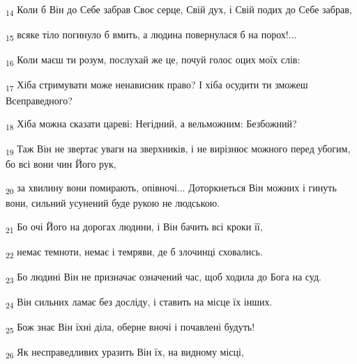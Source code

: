 \begin{tcolorbox}
\textsubscript{14} Коли б Він до Себе забрав Своє серце, Свій дух, і Свій подих до Себе забрав,
\end{tcolorbox}
\begin{tcolorbox}
\textsubscript{15} всяке тіло погинуло б вмить, а людина повернулася б на порох!...
\end{tcolorbox}
\begin{tcolorbox}
\textsubscript{16} Коли маєш ти розум, послухай же це, почуй голос оцих моїх слів:
\end{tcolorbox}
\begin{tcolorbox}
\textsubscript{17} Хіба стримувати може ненависник право? І хіба осудити ти зможеш Всеправедного?
\end{tcolorbox}
\begin{tcolorbox}
\textsubscript{18} Хіба можна сказати цареві: Негідний, а вельможним: Безбожний?
\end{tcolorbox}
\begin{tcolorbox}
\textsubscript{19} Таж Він не звертає уваги на зверхників, і не вирізнює можного перед убогим, бо всі вони чин Його рук,
\end{tcolorbox}
\begin{tcolorbox}
\textsubscript{20} за хвилину вони помирають, опівночі... Доторкнеться Він можних і гинуть вони, сильний усунений буде рукою не людською.
\end{tcolorbox}
\begin{tcolorbox}
\textsubscript{21} Бо очі Його на дорогах людини, і Він бачить всі кроки її,
\end{tcolorbox}
\begin{tcolorbox}
\textsubscript{22} немає темноти, немає і темряви, де б злочинці сховались.
\end{tcolorbox}
\begin{tcolorbox}
\textsubscript{23} Бо людині Він не призначає означений час, щоб ходила до Бога на суд.
\end{tcolorbox}
\begin{tcolorbox}
\textsubscript{24} Він сильних ламає без досліду, і ставить на місце їх інших.
\end{tcolorbox}
\begin{tcolorbox}
\textsubscript{25} Бож знає Він їхні діла, оберне вночі і почавлені будуть!
\end{tcolorbox}
\begin{tcolorbox}
\textsubscript{26} Як несправедливих уразить Він їх, на видному місці,
\end{tcolorbox}

